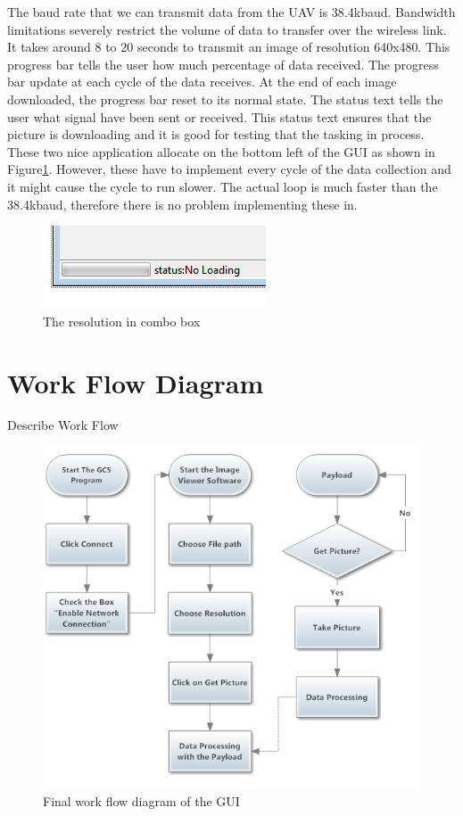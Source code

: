The baud rate that we can transmit data from the UAV is 38.4kbaud. Bandwidth limitations severely restrict the volume of data to transfer over the wireless link. It takes around 8 to 20 seconds to transmit an image of resolution 640x480. This progress bar tells the user how much percentage of data received. The progress bar update at each cycle of the data receives. At the end of each image downloaded, the progress bar reset to its normal state.  The status text tells the user what signal have been sent or received. This status text ensures that the picture is downloading and it is good for testing that the tasking in process. These two nice application allocate on the bottom left of the GUI as shown in Figure\ref{progressBar}. However, these have to implement every cycle of the data collection and it might cause the cycle to run slower. The actual loop is much faster than the 38.4kbaud, therefore there is no problem implementing these in.
\begin{figure}[!hbtp]
\begin{center}
\includegraphics[scale=1]{figures/progressBar.png} 
\end{center}
\caption{The resolution in combo box\label{progressBar}}
\end{figure}


\section{Work Flow Diagram}
Describe Work Flow

\begin{figure}[H]
\begin{center}
\includegraphics[scale=1]{figures/finalWorkFlow.png} 
\end{center}
\caption{Final work flow diagram of the GUI\label{GUI_finalWorkFlow}}
\end{figure}
